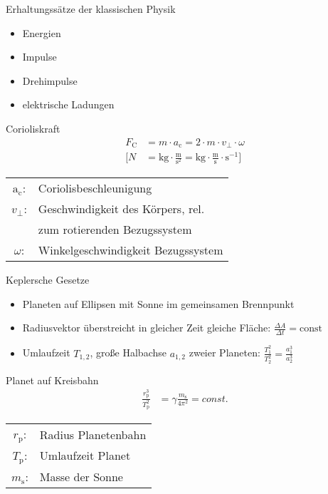 \begin{karte}{Erhaltungssätze der klassischen Physik}
    \begin{itemize}
        \item Energien
        \item Impulse
        \item Drehimpulse
        \item elektrische Ladungen
    \end{itemize}
\end{karte}

\begin{karte}{Corioliskraft}
    \begin{align*}
        F_\text{C} &= m \cdot a_\text{c} = 2 \cdot m \cdot v_\bot \cdot \omega \\
        \bigg[ N &= \text{kg} \cdot \frac{\text{m}}{\text{s}^2} = \text{kg} \cdot \frac{\text{m}}{\text{s}} \cdot \text{s}^{-1} \bigg]
    \end{align*}
    \begin{tabular}[t]{cl}
        \(\text{a}_\text{c}\): & Coriolisbeschleunigung \\
        \(v_\bot\): & Geschwindigkeit des Körpers, rel. \\
            & zum rotierenden Bezugssystem \\
        \(\omega\): & Winkelgeschwindigkeit Bezugssystem
    \end{tabular}
\end{karte}

\begin{karte}{Keplersche Gesetze}
    \begin{itemize}
        \item Planeten auf Ellipsen mit Sonne im gemeinsamen Brennpunkt
        \item Radiusvektor überstreicht in gleicher Zeit gleiche Fläche: \(\frac{\Delta A}{\Delta t} = \text{const}\)
        \item Umlaufzeit \(T_{1,2}\), große Halbachse \(a_{1,2}\) zweier Planeten: \( \frac{T_1^2}{T_2^2} = \frac{a_1^3}{a_2^3} \)
    \end{itemize}
\end{karte}

\begin{karte}{Planet auf Kreisbahn}
    \begin{align*}
        \frac{r_\text{p}^3}{T_\text{p}^2} &= \gamma \frac{m_\text{s}}{4 \pi^2} = const.
    \end{align*}
    \begin{tabular}[t]{cl}
        \(r_\text{p}\): & Radius Planetenbahn \\
        \(T_\text{p}\): & Umlaufzeit Planet \\
        \(m_\text{s}\): & Masse der Sonne \\
    \end{tabular}
\end{karte}


